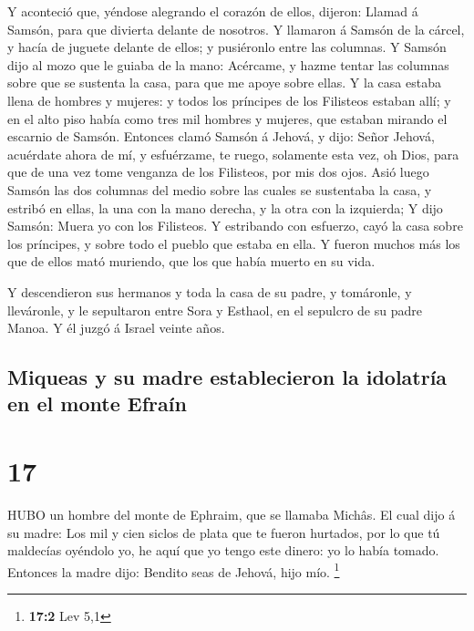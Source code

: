  Y aconteció que, yéndose alegrando el corazón de ellos,
dijeron: Llamad á Samsón, para que divierta delante de nosotros. Y
llamaron á Samsón de la cárcel, y hacía de juguete delante de ellos; y
pusiéronlo entre las columnas.  Y Samsón dijo al mozo que
le guiaba de la mano: Acércame, y hazme tentar las columnas sobre que se
sustenta la casa, para que me apoye sobre ellas.  Y la casa
estaba llena de hombres y mujeres: y todos los príncipes de los
Filisteos estaban allí; y en el alto piso había como tres mil hombres y
mujeres, que estaban mirando el escarnio de Samsón. 
Entonces clamó Samsón á Jehová, y dijo: Señor Jehová, acuérdate ahora de
mí, y esfuérzame, te ruego, solamente esta vez, oh Dios, para que de una
vez tome venganza de los Filisteos, por mis dos ojos.  Asió
luego Samsón las dos columnas del medio sobre las cuales se sustentaba
la casa, y estribó en ellas, la una con la mano derecha, y la otra con
la izquierda;  Y dijo Samsón: Muera yo con los Filisteos. Y
estribando con esfuerzo, cayó la casa sobre los príncipes, y sobre todo
el pueblo que estaba en ella. Y fueron muchos más los que de ellos mató
muriendo, que los que había muerto en su vida.

 Y descendieron sus hermanos y toda la casa de su padre, y
tomáronle, y lleváronle, y le sepultaron entre Sora y Esthaol, en el
sepulcro de su padre Manoa. Y él juzgó á Israel veinte años.

\hypertarget{miqueas-y-su-madre-establecieron-la-idolatruxeda-en-el-monte-efrauxedn}{%
\subsection{Miqueas y su madre establecieron la idolatría en el monte
Efraín}\label{miqueas-y-su-madre-establecieron-la-idolatruxeda-en-el-monte-efrauxedn}}

\hypertarget{section-16}{%
\section{17}\label{section-16}}

 HUBO un hombre del monte de Ephraim, que se llamaba Michâs.
 El cual dijo á su madre: Los mil y cien siclos de plata que
te fueron hurtados, por lo que tú maldecías oyéndolo yo, he aquí que yo
tengo este dinero: yo lo había tomado. Entonces la madre dijo: Bendito
seas de Jehová, hijo mío. \footnote{\textbf{17:2} Lev 5,1}

